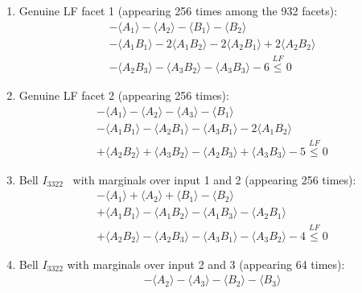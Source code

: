 \documentclass[aps,prx,twocolumn,superscriptaddress]{revtex4-1}
\theoremstyle{plain}
\begin{document}
\begin{enumerate}
\item Genuine LF facet 1 (appearing 256 times among the 932 facets):
	\begin{equation}\label{eq:LF1}
	\begin{split}
	 - \langle A_1 \rangle - \langle A_2 \rangle - \langle B_1 \rangle - \langle B_2 \rangle \\
	     - \langle A_1B_1 \rangle - 2\langle A_1B_2 \rangle  - 2\langle A_2B_1 \rangle + 2\langle A_2B_2 \rangle\\ - \langle A_2B_3 \rangle - \langle A_3B_2 	\rangle - \langle A_3B_3 \rangle -6 \overset{LF}{\le}  0
	\end{split}
	\end{equation}     
\item Genuine LF facet 2 (appearing 256 times):
	\begin{equation}\label{eq:LF2}
	\begin{split}
	- \langle A_1 \rangle - \langle A_2 \rangle - \langle A_3 \rangle - \langle B_1 \rangle \\
- \langle A_1B_1 \rangle - \langle A_2B_1 \rangle  - \langle A_3B_1 \rangle - 2\langle A_1B_2 \rangle\\
 + \langle A_2B_2 \rangle + \langle A_3B_2 \rangle - \langle A_2B_3 \rangle + \langle A_3B_3 \rangle -5 \overset{LF}{\le} 0
	\end{split}
	\end{equation}     
	\item Bell $I_{3322}$~\cite{CollinsGisin} with marginals over input 1 and 2 (appearing 256 times):
	\begin{equation}\label{eq:I3322_1}
	\begin{split}
     - \langle A_1 \rangle + \langle A_2 \rangle + \langle B_1 \rangle - \langle B_2 \rangle \\
    + \langle A_1B_1 \rangle - \langle A_1B_2 \rangle  - \langle A_1B_3 \rangle - \langle A_2B_1 \rangle \\
    + \langle A_2B_2 \rangle - \langle A_2B_3 \rangle - \langle A_3B_1 \rangle - \langle A_3B_2 \rangle -4 \overset{LF}{\le} 0
	\end{split}
    \end{equation}
\item Bell $I_{3322}$ with marginals over input 2 and 3  (appearing 64 times):
	\begin{equation}
	\begin{split}
	 - \langle A_2 \rangle - \langle A_3 \rangle - \langle B_2 \rangle - \langle B_3 \rangle \\

\end{split}
\end{equation}
\end{enumerate}
\end{document}
